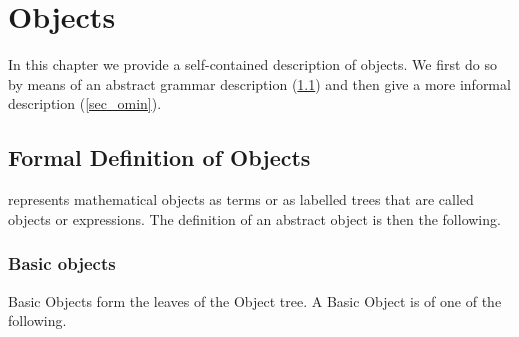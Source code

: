 \chapter{\OM Objects}\label{cha_obj}

In this chapter we provide a self-contained description of \OM objects. We first do so by
means of an abstract grammar description (\ref{sec_omabs}) and then give a more informal
description (\ref{sec_omin}).

\section{Formal Definition of \OM Objects}\label{sec_omabs}

\OM represents mathematical objects as terms or as labelled trees that are called \OM
objects or \OM expressions. The definition of an abstract \OM object is then the
following.

\subsection{Basic \OM objects}\label{sec_basic} 

Basic \OM Objects form the leaves of the \OM Object tree.  A Basic \OM Object is of one of
the following.
 
